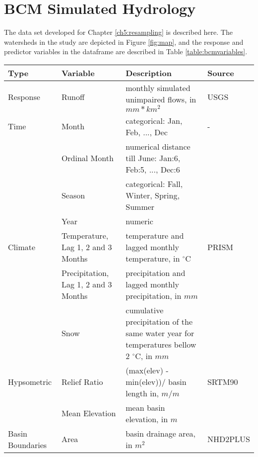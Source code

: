 \chapter{BCM Simulated Hydrology} \label{f:bcmdata}

The data set developed for Chapter \ref{ch5:resampling} is described here. The watersheds in the study are depicted in Figure \ref{fig:map}, and the response and predictor variables in the dataframe are described in Table \ref{table:bcmvariables}.

\begingroup
	\renewcommand{\arraystretch}{1.2} 
	\linespread{1.0}
	\footnotesize 
	\centering
	\begin{longtable}[h]{p{2cm}p{2.55cm}p{8.04cm}p{2.24cm}}
	\toprule
	Type & Variable & Description & Source \\
	\midrule
	\endhead
	Response & Runoff & monthly simulated unimpaired flows, in $mm*km^2$ & USGS \cite{flint2014california} \\
	\midrule
	Time & Month & categorical: Jan, Feb, ..., Dec & - \\
	& Ordinal Month & numerical distance till June: Jan:6, Feb:5, ..., Dec:6 & \\
	& Season & categorical: Fall, Winter, Spring, Summer & \\
	& Year & numeric & \\
	\midrule
	Climate & Temperature, Lag 1, 2 and 3 Months & temperature and lagged monthly temperature, in $^{\circ}$C & PRISM  \cite{edmund2015package} \\
	& Precipitation, Lag 1, 2 and 3 Months & precipitation and lagged monthly precipitation, in $mm$ &  \\  
	& Snow & cumulative precipitation of the same water year for temperatures bellow 2 $^{\circ}$C, in $mm$& \\
	\midrule
	Hypsometric & Relief Ratio & (max(elev) - min(elev))/ basin length in, $m/m$ & SRTM90 \cite{jarvis2008hole}\\
	& Mean Elevation & mean basin elevation, in $m$ & \\
	\midrule
	Basin Boundaries & Area & basin drainage area, in $m^2$ & NHD2PLUS \cite{mckay2012nhdplus}\\

\end{longtable}
